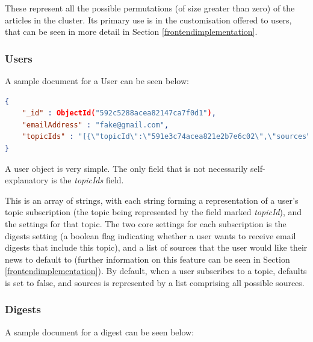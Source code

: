 \documentclass[12pt]{article}
\begin{document}
These represent all the possible permutations (of size greater than zero) of the articles in the cluster. Its primary use is in the customisation offered to users, that can be seen in more detail in Section \ref{frontendimplementation}.

\subsubsection{Users}

A sample document for a User can be seen below:

\begin{lstlisting}[language=json, firstnumber=1, caption={A sample document in the Users table},captionpos=b]
{
    "_id" : ObjectId("592c5288acea82147ca7f0d1"),
    "emailAddress" : "fake@gmail.com",
    "topicIds" : "[{\"topicId\":\"591e3c74acea821e2b7e6c02\",\"sources\":[\"wikipedia\",\"business-insider-uk\",\"daily-mail\",\"espn-cric-info\",\"metro\",\"mirror\",\"newsweek\",\"sky-sports-news\",\"the-telegraph\",\"the-times-of-india\",\"bbc-news\",\"bbc-sport\",\"bloomberg\",\"cnn\",\"cnbc\",\"espn\",\"four-four-two\",\"the-washington-post\",\"the-wall-street-journal\",\"associated-press\",\"the-guardian-uk\"],\"digests\":false}]"
}
\end{lstlisting}

A user object is very simple. The only field that is not necessarily self-explanatory is the \emph{topicIds} field. 

This is an array of strings, with each string forming a representation of a user's topic subscription (the topic being represented by the field marked \emph{topicId}), and the settings for that topic. The two core settings for each subscription is the digests setting (a boolean flag indicating whether a user wants to receive email digests that include this topic), and a list of sources that the user would like their news to default to (further information on this feature can be seen in Section \ref{frontendimplementation}). By default, when a user subscribes to a topic, defaults is set to false, and sources is represented by a list comprising all possible sources.

\subsubsection{Digests}

A sample document for a digest can be seen below:
\end{document}
